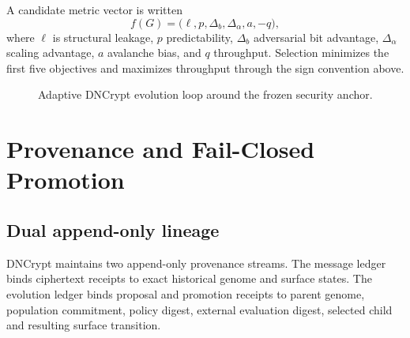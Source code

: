 A candidate metric vector is written
\begin{equation}
f(G)=\bigl(\ell,p,\Delta_b,\Delta_\alpha,a,-q\bigr),
\end{equation}
where $\ell$ is structural leakage, $p$ predictability, $\Delta_b$ adversarial bit advantage, $\Delta_\alpha$ scaling advantage, $a$ avalanche bias, and $q$ throughput. Selection minimizes the first five objectives and maximizes throughput through the sign convention above.

\begin{figure}[ht]
\centering
{}
\caption{Adaptive DNCrypt evolution loop around the frozen security anchor.}
\end{figure}

\chapter[Provenance and Fail-Closed Promotion]{Provenance and Fail-Closed\\Promotion}
\section{Dual append-only lineage}
DNCrypt maintains two append-only provenance streams. The message ledger binds ciphertext receipts to exact historical genome and surface states. The evolution ledger binds proposal and promotion receipts to parent genome, population commitment, policy digest, external evaluation digest, selected child and resulting surface transition.

